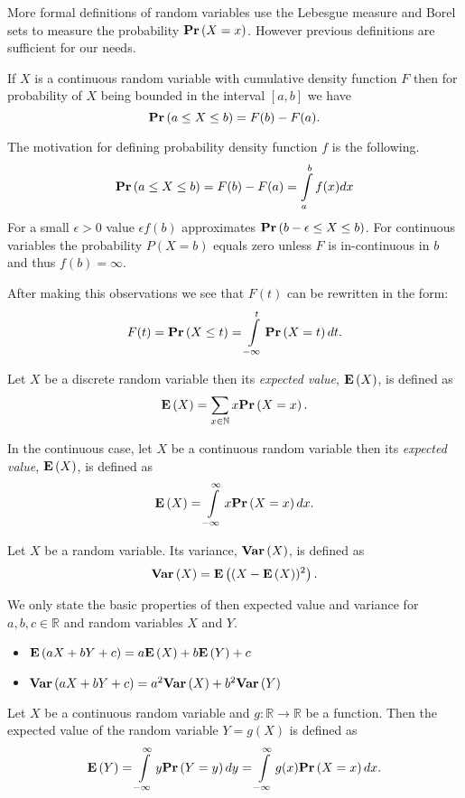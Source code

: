 More formal definitions of random variables use the Lebesgue measure and Borel sets to measure the probability $\mathbf{Pr}\left(X = x\right)$. However previous definitions are sufficient for our needs.

If $X$ is a continuous random variable with cumulative density function $F$ then for probability of $X$ being bounded in the interval $\left[a, b\right]$ we have
\[
\mathbf{Pr}\left(a \leq X \leq b\right) = F(b) - F(a) \text{.}
\]

The motivation for defining probability density function $f$ is the following.
\[
\mathbf{Pr}\left(a \leq X \leq b\right) = F(b) - F(a) = \int\limits_{a}^{b} f(x) dx
\]
For a small $\epsilon > 0$ value $\epsilon f(b)$ approximates $\mathbf{Pr}\left(b - \epsilon \leq X \leq b\right)$. For continuous variables the probability $P(X = b)$ equals zero unless $F$ is in-continuous in $b$ and thus $f(b) = \infty$.	

After making this observations we see that $F(t)$ can be rewritten in the form:
\[
F(t) = \mathbf{Pr}\left(X \leq t\right) = \int\limits_{-\infty}^{t} \mathbf{Pr}\left(X = t\right) dt \text{.}
\]

\begin{definition}
Let $X$ be a discrete random variable then its \emph{expected value}, $\mathbf{E}\left(X\right)$,  is defined as
\[
\mathbf{E}\left(X\right) = \displaystyle\sum_{x \in \mathbb{N}} x \mathbf{Pr}\left(X = x\right) \text{.}
\]

In the continuous case, let $X$ be a continuous random variable then its \emph{expected value}, $\mathbf{E}\left(X\right)$, is defined as
\[
\mathbf{E}\left(X\right) = \int\limits_{-\infty}^{\infty} x \mathbf{Pr}\left(X = x\right) dx \text{.}
\]
\end{definition}

\begin{definition}[Variance]
Let $X$ be a random variable. Its variance, $\mathbf{Var}\left(X\right)$, is defined as \[ \mathbf{Var}\left(X\right) = \mathbf{E}\left((X - \mathbf{E}\left(X\right)) ^ 2\right) \text{.} \]
\end{definition}

We only state the basic properties of then expected value and variance for $a, b, c \in \mathbb{R}$ and random variables $X$ and $Y$.
\begin{itemize}
\item $\mathbf{E}\left(aX + bY + c\right) = a\mathbf{E}\left(X\right) + b\mathbf{E}\left(Y\right) + c$
\item $\mathbf{Var}\left(aX + bY + c\right) = a ^ 2 \mathbf{Var}\left(X\right) + b ^ 2 \mathbf{Var}\left(Y\right)$
\end{itemize}

\begin{definition}
\end{definition}
Let $X$ be a continuous random variable and $g: \mathbb{R} \rightarrow \mathbb{R}$ be a function. Then the expected value of the random variable $Y = g(X)$ is defined as
\[
\mathbf{E}\left(Y\right) = \int\limits_{-\infty}^{\infty} y\mathbf{Pr}\left(Y = y\right) dy = \int\limits_{-\infty}^{\infty} g(x)\mathbf{Pr}\left(X = x\right) dx \text{.}
\]

